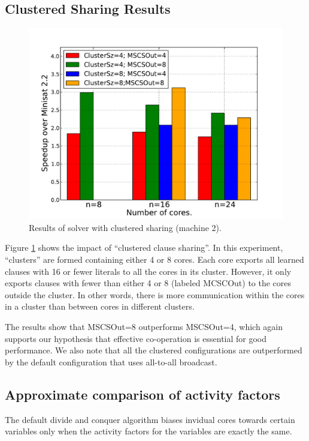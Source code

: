 \documentclass[letterpaper, compsoc, conference]{IEEEtran}
\begin{document}
\subsection{Clustered Sharing Results}
\begin{figure}[htbp]
  \includegraphics[width=\columnwidth]{images/cluster.pdf}
  \caption{Results of solver with clustered sharing (machine 2).}
  \label{fig:clusterres}
\end{figure}

Figure \ref{fig:clusterres} shows the impact of ``clustered clause sharing''. In
this experiment, ``clusters'' are formed containing either 4 or 8 cores. Each
core exports all learned clauses with 16 or fewer literals to all the cores in
its cluster. However, it only exports clauses with fewer than either 4 or 8
(labeled MCSCOut) to the cores outside the cluster. In other words, there is
more communication within the cores in a cluster than between cores in different
clusters.

The results show that MSCSOut=8 outperforms MSCSOut=4, which again supports our
hypothesis that effective co-operation is essential for good performance. We
also note that all the clustered configurations are outperformed by the default
configuration that uses all-to-all broadcast. 


\subsection{Approximate comparison of activity factors}
The default divide and conquer algorithm biases invidual cores towards certain
variables only when the activity factors for the variables are exactly the same.
\end{document}

